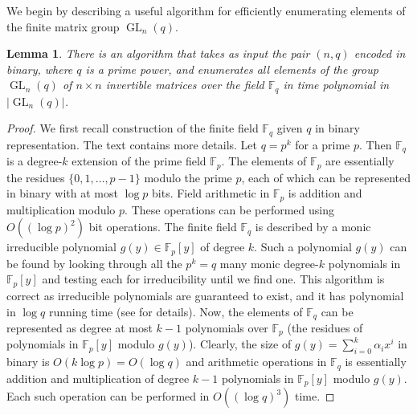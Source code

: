 \documentclass{elsarticle}
\newtheorem{lemma}[theorem]{Lemma}
\newcommand{\GL}{\mathop{\mathrm{GL}}\nolimits}
\newcommand{\F}{\mathbb{F}}
\begin{document}
We begin by describing a useful algorithm for efficiently enumerating
elements of the finite matrix group $\GL_n(q)$.

\begin{lemma}\label{desc-glnq}
  There is an algorithm that takes as input the pair $(n,q)$ encoded
  in binary, where $q$ is a prime power, and enumerates all elements
  of the group $\GL_n(q)$ of $n\times n$ invertible matrices over the
  field $\F_q$ in time polynomial in $|\GL_n(q)|$.
\end{lemma}

\begin{proof}
  We first recall construction of the finite field $\F_q$ given $q$ in
  binary representation. The text \cite[Chapter 25.4]{vzg-book}
  contains more details. Let $q=p^k$ for a prime $p$. Then $\F_q$ is a
  degree-$k$ extension of the prime field $\F_p$. The elements of
  $\F_p$ are essentially the residues $\{0,1,\ldots,p-1\}$ modulo the
  prime $p$, each of which can be represented in binary with at most
  $\log p$ bits. Field arithmetic in $\F_p$ is addition and
  multiplication modulo $p$. These operations can be performed using
  $O((\log p)^2)$ bit operations. The finite field $\F_q$ is described
  by a monic irreducible polynomial $g(y)\in\F_p[y]$ of degree
  $k$. Such a polynomial $g(y)$ can be found by looking through all
  the $p^k=q$ many monic degree-$k$ polynomials in $\F_p[y]$ and
  testing each for irreducibility until we find one. This algorithm is
  correct as irreducible polynomials are guaranteed to exist, and it
  has polynomial in $\log q$ running time (see \cite[Chapter
    12]{vzg-book} for details). Now, the elements of $\F_q$ can be
  represented as degree at most $k-1$ polynomials over $\F_p$ (the
  residues of polynomials in $\F_p[y]$ modulo $g(y)$). Clearly, the
  size of $g(y)=\sum_{i=0}^k \alpha_i x^i$ in binary is $O(k\log
  p)=O(\log q)$ and arithmetic operations in $\F_q$ is essentially
  addition and multiplication of degree $k-1$ polynomials in $\F_p[y]$
  modulo $g(y)$. Each such operation can be performed in $O((\log q)^3)$
  time.


\end{proof}
\end{document}
